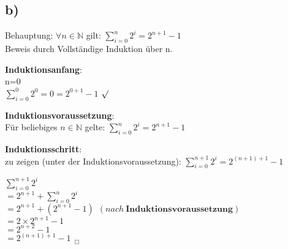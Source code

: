 \documentclass[11pt,a4paper]{article}
\begin{document}
\subsection*{b)}

Behauptung: $\forall n \in \mathbb{N}$ gilt: $\sum \limits_{i=0}^n 2^i = 2^{n+1}-1$
\\ Beweis durch Vollständige Induktion über n.

\textbf{Induktionsanfang}:
\\n=0
\\ $\sum \limits_{i=0}^0 2^0 = 0 = 2^{0+1}-1$ $\surd$

\textbf{Induktionsvoraussetzung}:
\\ Für beliebiges $n \in \mathbb{N}$ gelte:  $\sum \limits_{i=0}^n 2^i = 2^{n+1}-1$

\newpage
\textbf{Induktionsschritt}:
\\zu zeigen (unter der Induktionsvoraussetzung): $\sum \limits_{i=0}^{n+1} 2^i = 2^{(n+1)+1}-1$

$\sum \limits_{i=0}^{n+1} 2^i$
\\ $= 2^{n+1} + \sum \limits_{i=0}^{n} 2^i  $
\\ $= 2^{n+1} + (2^{n+1}-1) ~~ (nach ~ \textbf{Induktionsvoraussetzung})$
\\ $= 2 \times 2^{n+1}-1$
\\ $= 2^{n+2}-1$
\\ $= 2^{(n+1)+1}-1 ~~ _\Box$
\end{document}
